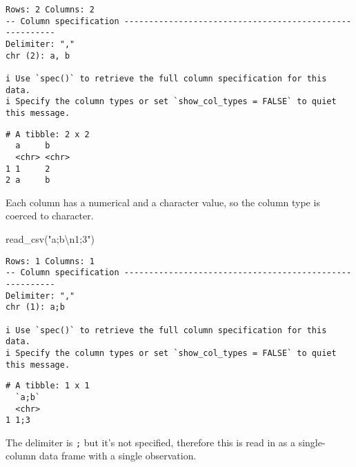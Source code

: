 \documentclass[
  letterpaper,
  DIV=11,
  numbers=noendperiod]{scrreprt}
\newenvironment{Shaded}{\begin{snugshade}}{\end{snugshade}}
\newcommand{\FunctionTok}[1]{\textcolor[rgb]{0.28,0.35,0.67}{#1}}
\newcommand{\NormalTok}[1]{\textcolor[rgb]{0.00,0.23,0.31}{#1}}
\newcommand{\SpecialCharTok}[1]{\textcolor[rgb]{0.37,0.37,0.37}{#1}}
\newcommand{\StringTok}[1]{\textcolor[rgb]{0.13,0.47,0.30}{#1}}
\begin{document}
\begin{enumerate}
\begin{tcolorbox}
\begin{verbatim}
Rows: 2 Columns: 2
-- Column specification --------------------------------------------------------
Delimiter: ","
chr (2): a, b

i Use `spec()` to retrieve the full column specification for this data.
i Specify the column types or set `show_col_types = FALSE` to quiet this message.
\end{verbatim}

\begin{verbatim}
# A tibble: 2 x 2
  a     b    
  <chr> <chr>
1 1     2    
2 a     b    
\end{verbatim}

  Each column has a numerical and a character value, so the column type
  is coerced to character.

  \end{tcolorbox}

  \begin{tcolorbox}[enhanced jigsaw, left=2mm, rightrule=.15mm, bottomtitle=1mm, opacitybacktitle=0.6, leftrule=.75mm, opacityback=0, colframe=quarto-callout-note-color-frame, bottomrule=.15mm, coltitle=black, toptitle=1mm, colback=white, titlerule=0mm, colbacktitle=quarto-callout-note-color!10!white, title={Answer}, toprule=.15mm, breakable, arc=.35mm]

\begin{Shaded}
\begin{Highlighting}[]
\FunctionTok{read\_csv}\NormalTok{(}\StringTok{"a;b}\SpecialCharTok{\textbackslash{}n}\StringTok{1;3"}\NormalTok{)}
\end{Highlighting}
\end{Shaded}

\begin{verbatim}
Rows: 1 Columns: 1
-- Column specification --------------------------------------------------------
Delimiter: ","
chr (1): a;b

i Use `spec()` to retrieve the full column specification for this data.
i Specify the column types or set `show_col_types = FALSE` to quiet this message.
\end{verbatim}

\begin{verbatim}
# A tibble: 1 x 1
  `a;b`
  <chr>
1 1;3  
\end{verbatim}

  The delimiter is \texttt{;} but it's not specified, therefore this is
  read in as a single-column data frame with a single observation.


\end{tcolorbox}
\end{enumerate}
\end{document}
